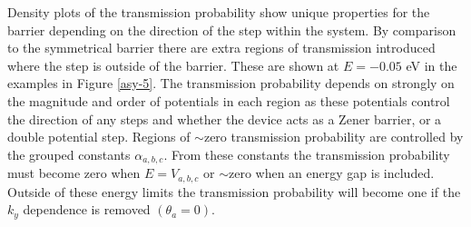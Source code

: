		Density plots of the transmission probability show unique properties for the barrier depending on the direction of the step within the system. By comparison to the symmetrical barrier there are extra regions of transmission introduced where the step is outside of the barrier. These are shown at $E=-0.05$ eV in the examples in Figure \ref{asy-5}. The transmission probability depends on strongly on the magnitude and order of potentials in each region as these potentials control the direction of any steps and whether the device acts as a Zener barrier, or a double potential step. Regions of $\sim$zero transmission probability are controlled by the grouped constants $\alpha_{a,b,c}$. From these constants the transmission probability must become zero when $E=V_{a,b,c}$ or $\sim$zero when an energy gap is included. Outside of these energy limits the transmission probability will become one if the $k_{y}$ dependence is removed $\left(\theta_{a}=0\right)$.
